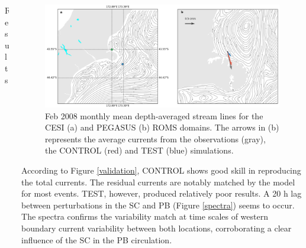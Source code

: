 \documentclass[final]{beamer}
\newlength{\onecolwid}
\newlength{\twocolwid}
\begin{document}
\begin{frame}[t]
\begin{columns}[t]
\begin{column}{\twocolwid}
\begin{columns}[t,totalwidth=\twocolwid]
\begin{column}{\onecolwid}
\begin{block}{Results}
            \end{block}


        \end{column} %

        \begin{column}{\onecolwid}\vspace{-.6in} %

            \begin{block}

            \begin{figure}
            \includegraphics[width=1.0\linewidth]{mean_flow.png}
            \caption{\label{mean_flow} Feb 2008 monthly mean depth-averaged stream lines for the CESI (a) and PEGASUS (b) ROMS domains. The arrows in (b) represents the average currents from the observations (gray), the CONTROL (red) and TEST (blue) simulations.}
            \end{figure}

            According to Figure \ref{validation}, CONTROL shows good skill in reproducing the total currents. The residual currents are notably matched by the model for most events. TEST, however, produced relatively poor results. A 20 h lag between perturbations in the SC and PB (Figure \ref{spectra}) seems to occur. The spectra confirms the variability match at time scales of western boundary current variability between both locations, corroborating a clear influence of the SC in the PB circulation. 


\end{block}
\end{column}
\end{columns}
\end{column}
\end{columns}
\end{frame}
\end{document}
